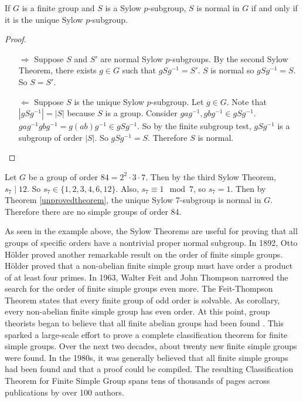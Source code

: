 \documentclass[a4paper]{article}
\begin{document}
\begin{theorem}
\label{unprovedtheorem}
If $G$ is a finite group and $S$ is a Sylow $p$-subgroup, $S$ is normal in $G$ if and only if it is the unique Sylow $p$-subgroup. \cite{wilson}
\end{theorem}
\pagebreak
\begin{proof}~
\begin{enumerate}
\item[$\Rightarrow$]
Suppose $S$ and $S'$ are normal Sylow $p$-subgroups. By the second Sylow Theorem, there exists $g \in G$ such that $g S g^{-1} = S'$. $S$ is normal so $g S g^{-1} = S$. So $S = S'$.
\item[$\Leftarrow$]
Suppose $S$ is the unique Sylow $p$-subgroup. Let $g \in G$. Note that $|g S g^{-1}| = |S|$ because $S$ is a group. Consider $g a g^{-1}, g b g^{-1} \in g S g^{-1}$. $g a g^{-1} g b g^{-1} = g (a b) g^{-1} \in g S g^{-1}$. So by the finite subgroup test, $g S g^{-1}$ is a subgroup of order $|S|$. So $g S g^{-1} = S$. Therefore $S$ is normal.
\end{enumerate}
\end{proof}

\begin{example}
Let $G$ be a group of order $84 = 2^2 \cdot 3 \cdot 7$. Then by the third Sylow Theorem, $s_7 \mid 12$. So $s_7 \in \{1, 2, 3, 4, 6, 12\}$. Also, $s_7 \equiv 1 \mod 7$, so $s_7 = 1$. Then by Theorem \ref{unprovedtheorem}, the unique Sylow 7-subgroup is normal in $G$. Therefore there are no simple groups of order 84.
\end{example}

As seen in the example above, the Sylow Theorems are useful for proving that all groups of specific orders have a nontrivial proper normal subgroup. In 1892, Otto Hölder proved another remarkable result on the order of finite simple groups. Hölder proved that a non-abelian finite simple group must have order a product of at least four primes. In 1963, Walter Feit and John Thompson narrowed the search for the order of finite simple groups even more. The Feit-Thompson Theorem states that every finite group of odd order is solvable. As corollary, every non-abelian finite simple group has even order. At this point, group theorists began to believe that all finite abelian groups had been found \cite{wilson}. This sparked a large-scale effort to prove a complete classification theorem for finite simple groups. Over the next two decades, about twenty new finite simple groups were found. In the 1980s, it was generally believed that all finite simple groups had been found and that a proof could be compiled. The resulting Classification Theorem for Finite Simple Group spans tens of thousands of pages across publications by over 100 authors.
\end{document}
